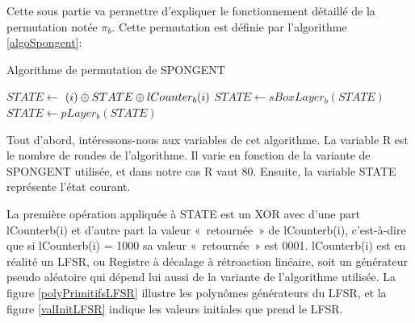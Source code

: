 				Cette sous partie va permettre d'expliquer le fonctionnement détaillé de la
			permutation notée $\pi_{b}$. Cette permutation est définie par l'algorithme
			\ref{algoSpongent}:

			\begin{algorithm}
				\caption{Algorithme de permutation de SPONGENT}
				\label{algoSpongent}
				\begin{algorithmic}
						\STATE $ STATE \leftarrow $ $(i) \mathbin{\oplus} STATE \mathbin{\oplus} lCounter_{b}(i)$
						\STATE $ STATE \leftarrow sBoxLayer_{b}(STATE)$
						\STATE $ STATE \leftarrow pLayer_{b}(STATE)$
					\ENDFOR
				\end{algorithmic}
			\end{algorithm}

				Tout d'abord, intéressons-nous aux variables de cet algorithme. La
			variable R est le nombre de rondes de l'algorithme. Il varie en fonction
			de la variante de SPONGENT utilisée, et dans notre cas R vaut 80. Ensuite,
			la variable STATE représente l'état courant.

				La première opération appliquée à STATE est un XOR avec d'une part
			lCounterb(i) et d'autre part la valeur « retournée » de lCounterb(i),
			c'est-à-dire que si lCounterb(i) = 1000 sa valeur « retournée » est 0001.
			lCounterb(i) est en réalité un LFSR, ou Registre à décalage à rétroaction
			linéaire, soit un générateur pseudo aléatoire qui dépend lui aussi de la
			variante de l'algorithme utilisée. La figure \ref{polyPrimitifsLFSR}
			illustre les polynômes générateurs du LFSR, et la figure \ref{valInitLFSR}
			indique les valeurs initiales que prend le LFSR.

